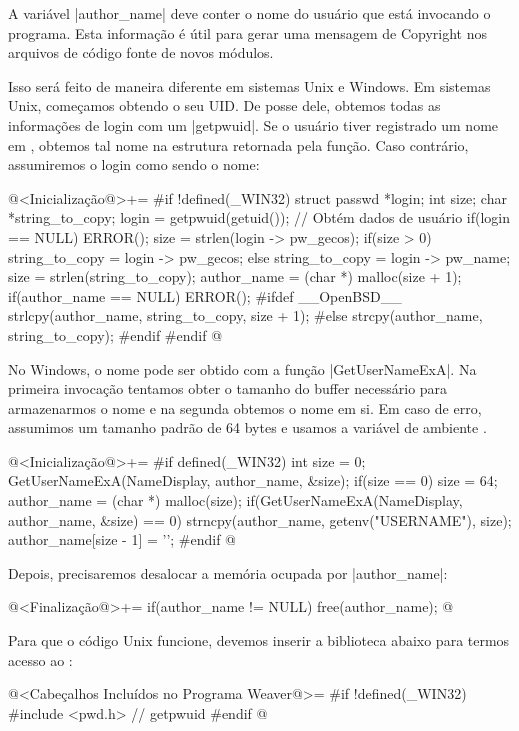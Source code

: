 {A variável |author_name| deve conter o nome do usuário que está
invocando o programa. Esta informação é útil para gerar uma mensagem
de Copyright nos arquivos de código fonte de novos módulos.

Isso será feito de maneira diferente em sistemas Unix e Windows. Em
sistemas Unix, começamos obtendo o seu UID. De posse dele, obtemos
todas as informações de login com um |getpwuid|. Se o usuário tiver
registrado um nome em , obtemos tal nome na
estrutura retornada pela função. Caso contrário, assumiremos o login
como sendo o nome:

\iniciocodigo
@<Inicialização@>+=
#if !defined(_WIN32)
{
  struct passwd *login;
  int size;
  char *string_to_copy;
  login = getpwuid(getuid()); // Obtém dados de usuário
  if(login == NULL) ERROR();
  size = strlen(login -> pw_gecos);
  if(size > 0)
    string_to_copy = login -> pw_gecos;
  else
    string_to_copy = login -> pw_name;
  size = strlen(string_to_copy);
  author_name = (char *) malloc(size + 1);
  if(author_name == NULL) ERROR();
#ifdef __OpenBSD__
  strlcpy(author_name, string_to_copy, size + 1);
#else
  strcpy(author_name, string_to_copy);
#endif
}
#endif
@
\fimcodigo

No Windows, o nome pode ser obtido com a função |GetUserNameExA|. Na
primeira invocação tentamos obter o tamanho do buffer necessário para
armazenarmos o nome e na segunda obtemos o nome em si. Em caso de
erro, assumimos um tamanho padrão de 64 bytes e usamos a variável de
ambiente .

\iniciocodigo
@<Inicialização@>+=
#if defined(_WIN32)
{
  int size = 0;
  GetUserNameExA(NameDisplay, author_name, &size);
  if(size == 0)
    size = 64;
  author_name = (char *) malloc(size);
  if(GetUserNameExA(NameDisplay, author_name, &size) == 0){
    strncpy(author_name, getenv("USERNAME"), size);
    author_name[size - 1] = '\0';
  }
}
#endif
@
\fimcodigo

Depois, precisaremos desalocar a memória ocupada por |author_name|:

\iniciocodigo
@<Finalização@>+=
if(author_name != NULL) free(author_name);
@
\fimcodigo

Para que o código Unix funcione, devemos inserir a biblioteca abaixo
para termos acesso ao :

@<Cabeçalhos Incluídos no Programa Weaver@>=
#if !defined(_WIN32)
#include <pwd.h> // getpwuid
#endif
@


}
